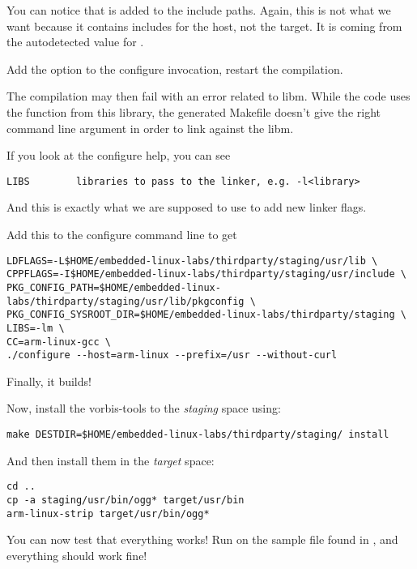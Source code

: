 You can notice that  is added to the include paths.
Again, this is not what we want because it contains includes for the
host, not the target. It is coming from the autodetected value for
.

Add the  option to the configure invocation,
restart the compilation.

The compilation may then fail with an error related to libm. While
the code uses the function from this library, the generated Makefile
doesn't give the right command line argument in order to link against
the libm.

If you look at the configure help, you can see
\begin{verbatim}
LIBS        libraries to pass to the linker, e.g. -l<library>
\end{verbatim}

And this is exactly what we are supposed to use to add new linker
flags.

Add this to the configure command line to get
\begin{verbatim}
LDFLAGS=-L$HOME/embedded-linux-labs/thirdparty/staging/usr/lib \
CPPFLAGS=-I$HOME/embedded-linux-labs/thirdparty/staging/usr/include \
PKG_CONFIG_PATH=$HOME/embedded-linux-labs/thirdparty/staging/usr/lib/pkgconfig \
PKG_CONFIG_SYSROOT_DIR=$HOME/embedded-linux-labs/thirdparty/staging \
LIBS=-lm \
CC=arm-linux-gcc \
./configure --host=arm-linux --prefix=/usr --without-curl
\end{verbatim}

Finally, it builds!

Now, install the vorbis-tools to the {\em staging} space using:

\begin{verbatim}
make DESTDIR=$HOME/embedded-linux-labs/thirdparty/staging/ install
\end{verbatim}

And then install them in the {\em target} space:

\begin{verbatim}
cd ..
cp -a staging/usr/bin/ogg* target/usr/bin
arm-linux-strip target/usr/bin/ogg*
\end{verbatim}

You can now test that everything works! Run  on the
sample file found in , and everything should
work fine!
